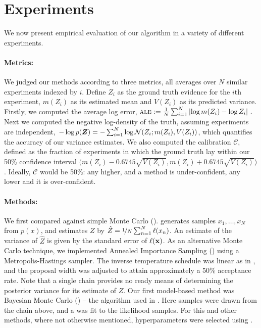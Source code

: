 \documentclass{article} %
\begin{document}
\section{Experiments}
\label{sec:experiments}



We now present empirical evaluation of our algorithm in a variety of different experiments.

\paragraph{Metrics:} We judged our methods according to three metrics, all averages over $N$ similar experiments indexed by $i$. Define $Z_i$ as the ground truth evidence for the $i$th experiment, $m(Z_i)$ as its estimated mean  and $V(Z_i)$  as its predicted variance. Firstly, we computed the average log error,
$
\acro{ale} 
\deq \frac{1}{N} \sum_{i=1}^{N} \left|{\log m(Z_i) - \log Z_i}\right|\,.
$
Next we computed the negative log-density of the truth, assuming experiments are independent,
$
-\log p(\vect{Z}) = -\sum_{i=1}^{N} \log \N{Z_i}{m(Z_i)}{V(Z_i)}
$, which quantifies the accuracy of our variance estimates. We also computed the calibration $\mathcal{C}$, defined as the fraction of experiments in which the ground truth lay within our 50\% confidence interval $\bigl(m(Z_i) - 0.6745 \surd{V(Z_i)}, m(Z_i) + 0.6745 \surd{V(Z_i)}\bigr)$. Ideally, $\mathcal{C}$ would be  50\%: any higher, and a method is under-confident, any lower and it is over-confident. 

\paragraph{Methods:} We first compared against simple Monte Carlo ().  generates samples $x_1, \dots, x_N$ from $p(x)$, and estimates $Z$ by $\hat{Z} = \nicefrac{1}{N} \sum_{n=1}^{N} \lfn(x_n)$.  An estimate of the variance of $\hat{Z}$ is given by the standard error of $\lfn({\bf x})$. As an alternative Monte Carlo technique, we implemented Annealed Importance Sampling () using a Metropolis-Hastings sampler.  The inverse temperature schedule was linear as in \cite{BZMonteCarlo}, and the proposal width was adjusted to attain approximately a 50\% acceptance rate. Note that a single  chain provides no ready means of determining the posterior variance for its  estimate of $Z$.  
Our first model-based method was Bayesian Monte Carlo () -- the algorithm used in \cite{BZMonteCarlo}. Here samples were drawn from the  chain above, and a \gpb was fit to the likelihood samples. For this and other methods, where not otherwise mentioned, \gpb hyperparameters were selected using . 
\end{document}
